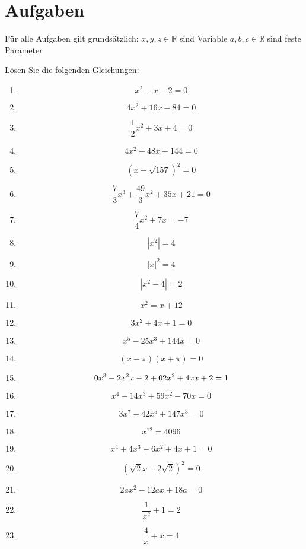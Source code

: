 \section{Aufgaben}
\newcommand{\lineup}{\vspace{-1em}}
	
	
	Für alle Aufgaben gilt grundsätzlich:
	$ x, y, z \in \mathbb{R} $ sind Variable
	$ a, b, c \in \mathbb{R} $ sind feste Parameter
	
	Lösen Sie die folgenden Gleichungen:
	\begin{enumerate}\abovedisplayskip-1em
		\item 
		\[ x^2 - x - 2 = 0 \]
		\item
		\[4x^2 + 16x - 84 = 0 \]
		\item
		\[\frac 1 2 x^2 + 3x + 4 = 0 \]
		\item
		\[4x^2 + 48x + 144 = 0 \]
		\item 
		\[(x - \sqrt{157})^2 = 0 \]
		\item
		\[\frac 7 3 x^3 + \frac {49} 3 x^2 + 35x + 21 = 0 \]
		\item
		\[\frac 7 4 x^2 + 7x = -7 \]
		\item
		\[ |x^2| = 4 \]
		\item
		\[ |x|^2 = 4 \]
		\item
		\[ |x^2 - 4 | = 2 \]
		\item
		\[x^2 = x + 12 \]
		\item
		\[3x^2 + 4x + 1 = 0\]
		\item
		\[x^5 - 25x^3 + 144x = 0 \]
		\item
		\[(x - \pi)(x + \pi) = 0 \]
		\item
		\[\frac {x^3 - 2x^2} {x - 2} + \frac {2x^2 + 4x} {x + 2} = \-1\]
		\item
		\[x^4 - 14x^3 + 59x^2 - 70x = 0\]
		\item
		\[3x^7 - 42x^5 + 147x^3 = 0\]
		\item
		\[x^{12} = 4096\]
		\item
		\[x^4 + 4x^3 + 6x^2 + 4x + 1 = 0\]
		\item
		\[(\sqrt 2 x + 2 \sqrt 2)^2 = 0\]
		\item
		\[2ax^2 - 12ax + 18a = 0\]
		\item
		\[\frac 1 {x^2} + 1 = 2\]
		\item
		\[\frac 4 x + x = 4\]
	\end{enumerate}